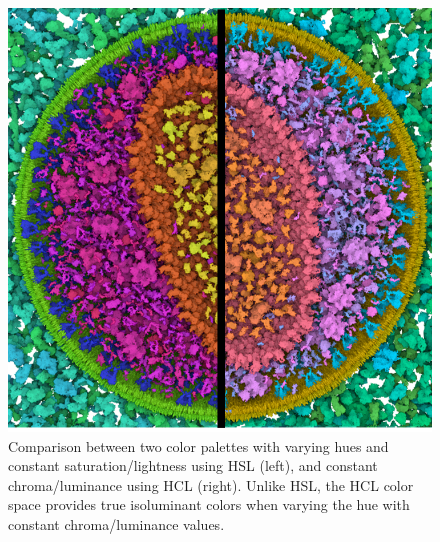 \documentclass{egpubl}
\begin{document}
	
	\begin{figure}
		\centering
		\includegraphics[width=0.75\linewidth]{Figures/hslvshcl}
		\caption{Comparison between two color palettes with varying hues and constant saturation/lightness using HSL (left), and constant chroma/luminance using HCL (right). 
		Unlike HSL, the HCL color space provides true isoluminant colors when varying the hue with constant chroma/luminance values.
		 }
		\label{fig:hslvshcl}
	\end{figure}
	
\end{document}

